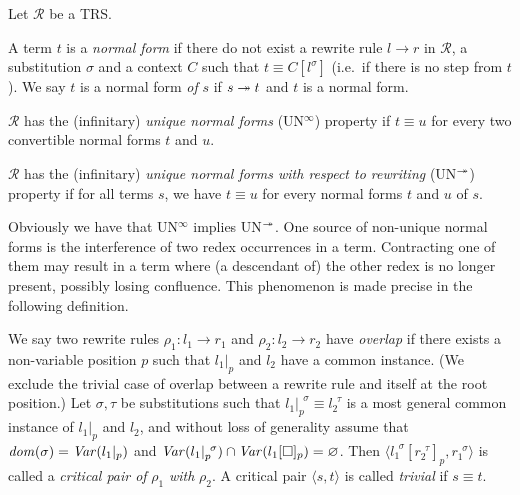 \begin{definition}\label{def:normalisation}%
  Let $\mathcal{R}$ be a TRS.
  \begin{compactenum}
    \item
      A term $t$ is a \emph{normal form} if there do not exist a
      rewrite rule $l \rightarrow r$ in $\mathcal{R}$, a substitution
      $\sigma$ and a context $C$ such that $t \equiv C[l^\sigma]$
      (i.e.\ if there is no step from $t$). We say $t$ is a normal
      form \emph{of} $s$ if $s \twoheadrightarrow t$ and $t$ is a normal form.
    \item
      $\mathcal{R}$ has the (infinitary) \emph{unique normal forms}
      (UN$^\infty$) property if $t \equiv u$ for every two
      convertible normal forms $t$ and $u$.
    \item
      $\mathcal{R}$ has the (infinitary) \emph{unique normal forms
      with respect to rewriting} (UN$^{\twoheadrightarrow}$) property if for all
      terms $s$, we have $t \equiv u$ for every normal forms $t$ and
      $u$ of $s$.
  \end{compactenum}
\end{definition}

Obviously we have that UN$^\infty$ implies UN$^{\twoheadrightarrow}$. One source
of non-unique normal forms is the interference of two redex occurrences
in a term. Contracting one of them may result in a term where (a
descendant of) the other redex is no longer present, possibly losing
confluence. This phenomenon is made precise in the following
definition.

\begin{definition}\label{def:overlap}%
We say two rewrite rules $\rho_1 : l_1 \rightarrow r_1$ and $\rho_2 :
l_2 \rightarrow r_2$ have \emph{overlap} if there exists a
non-variable position $p$ such that $l_1 |_p$ and $l_2$ have a common
instance. (We exclude the trivial case of overlap between a rewrite
rule and itself at the root position.)
Let $\sigma, \tau$ be substitutions such that $l_1 |_p ^{\,\;\sigma}
\equiv l_2 ^{\,\;\tau}$ is a most general common instance of $l_1 |_p$
and $l_2$, and without loss of generality assume that $\mathit{dom}(\sigma) =
\mathit{Var}(l_1 |_p)$ and $\mathit{Var}(l_1 |_p ^{\,\;\sigma}) \cap \mathit{Var}(l_1[\Box]_p)
= \varnothing$. Then $\langle l_1 ^{\,\;\sigma}[r_2^{\,\;\tau}]_p,
r_1^{\,\;\sigma} \rangle$ is called a \emph{critical pair of} $\rho_1$
\emph{with} $\rho_2$. A critical pair $\langle s, t \rangle$ is called
\emph{trivial} if $s \equiv t$.
\end{definition}

